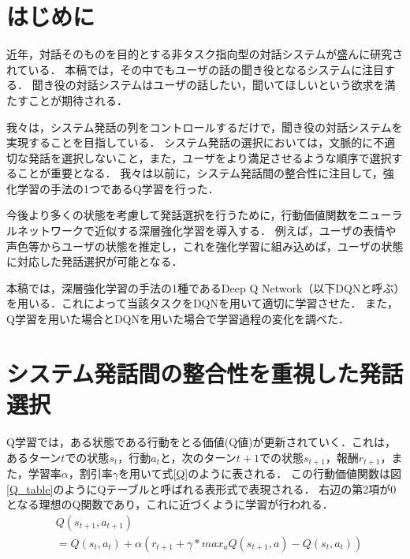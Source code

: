 \documentclass[a4j,dvipdfmx]{jarticle}
\begin{document}
\maketitle
\thispagestyle{empty}


\section{はじめに}
近年，対話そのものを目的とする非タスク指向型の対話システムが盛んに研究されている．
本稿では，その中でもユーザの話の聞き役となるシステム\cite{meguro}\cite{ishida}に注目する．
聞き役の対話システムはユーザの話したい，聞いてほしいという欲求を満たすことが期待される．

我々は，システム発話の列をコントロールするだけで，聞き役の対話システムを実現することを目指している\cite{nishimoto}．
システム発話の選択においては，文脈的に不適切な発話を選択しないこと，また，ユーザをより満足させるような順序で選択することが重要となる．
我々は以前に，システム発話間の整合性に注目して，強化学習の手法の1つであるQ学習を行った\cite{kuroda}．



今後より多くの状態を考慮して発話選択を行うために，行動価値関数をニューラルネットワークで近似する深層強化学習を導入する．
例えば，ユーザの表情や声色等からユーザの状態を推定し，これを強化学習に組み込めば，ユーザの状態に対応した発話選択が可能となる．


本稿では，深層強化学習の手法の1種であるDeep Q Network\cite{DQN_origin}（以下DQNと呼ぶ）を用いる．これによって当該タスクをDQNを用いて適切に学習させた．
また，Q学習を用いた場合とDQNを用いた場合で学習過程の変化を調べた．



\section{システム発話間の整合性を重視した発話選択}\label{Qlearning_sekkei}
Q学習では，ある状態である行動をとる価値(Q値)が更新されていく．これは，あるターン$t$での状態$s_{t}$，行動$a_{t}$と，次のターン$t+1$での状態$s_{t+1}$，報酬$r_{t+1}$，また，学習率$\alpha$，割引率$\gamma$を用いて式\ref{Q}のように表される．
この行動価値関数は図\ref{Q_table}のようにQテーブルと呼ばれる表形式で表現される．
右辺の第2項が0となる理想のQ関数であり，これに近づくように学習が行われる．
\begin{equation}
\label{Q}
\begin{split}
&Q(s_{t+1},a_{t+1}) \\&= Q(s_t,a_t)+\alpha(r_{t+1}+\gamma*max_aQ(s_{t+1},a)-Q(s_t,a_t))
\end{split}
\end{equation}
\end{document}
